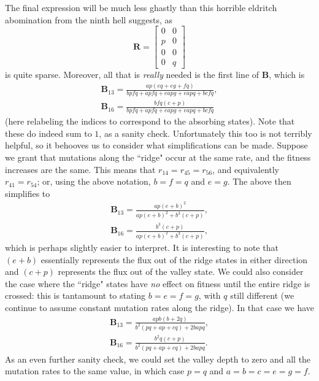 \documentclass[10pt]{revtex4}
\begin{document}
The final expression will be much less ghastly than this horrible eldritch abomination from the ninth hell suggests, as
\begin{equation}
\textbf{R} = 
\begin{bmatrix}
0 & 0 \\
p & 0 \\
0 & 0 \\
0 & q
\end{bmatrix}
\end{equation}
is quite sparse.
Moreover, all that is \emph{really} needed is the first line of $\textbf{B}$, which is
\begin{align}
\textbf{B}_{13} = \frac{ap(eq+eg+fq)}{bpfq+apfq+eapg+eapq+bcfq}, \\
\textbf{B}_{16} = \frac{bfq(c+p)}{bpfq+apfq+eapg+eapq+bcfq}
\end{align}
(here relabeling the indices to correspond to the absorbing states).
Note that these do indeed sum to $1$, as a sanity check.
Unfortunately this too is not terribly helpful, so it behooves us to consider what simplifications can be made.
Suppose we grant that mutations along the ``ridge" occur at the same rate, and the fitness increases are the same.
This means that $r_{14} = r_{45} = r_{56}$, and equivalently $r_{41} = r_{54}$; or, using the above notation, $b = f = q$ and $e = g$.
The above then simplifies to
\begin{align}
\textbf{B}_{13} = \frac{ap(e+b)^2}{ap(e+b)^2 + b^3(c+p)}, \\
\textbf{B}_{16} = \frac{b^3(c+p)}{ap(e+b)^2 + b^3(c+p)},
\end{align}
which is perhaps slightly easier to interpret.
It is interesting to note that $(e+b)$ essentially represents the flux out of the ridge states in either direction and $(c+p)$ represents the flux out of the valley state.
We could also consider the case where the ``ridge" states have \emph{no} effect on fitness until the entire ridge is crossed: this is tantamount to stating $b = e = f = g$, with $q$ still different (we continue to assume constant mutation rates along the ridge).
In that case we have
\begin{align}
\textbf{B}_{13} = \frac{apb(b+2q)}{b^2(pq+ap+cq)+2bapq}, \\
\textbf{B}_{16} = \frac{b^2q(c+p)}{b^2(pq+ap+cq)+2bapq}.
\end{align}
As an even further sanity check, we could set the valley depth to zero and all the mutation rates to the same value, in which case $p = q$ and $a = b = c = e = g = f$.
\end{document}

